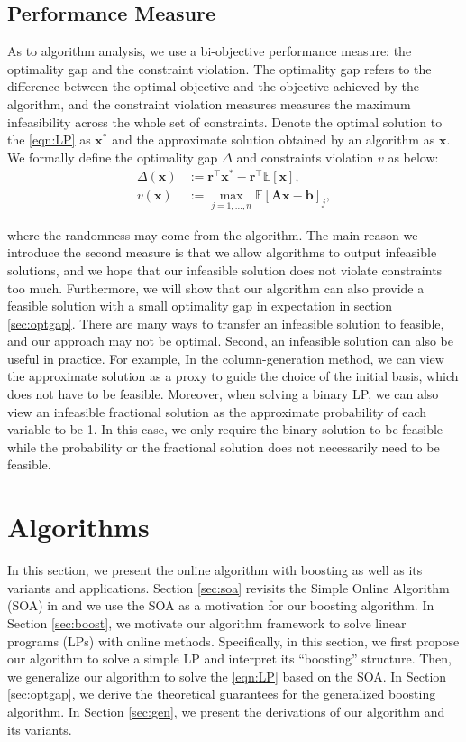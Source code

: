 \documentclass{article} %
\begin{document}
\subsection{Performance Measure}
\label{sec:perfmeas}
As to algorithm analysis, we use a bi-objective performance measure: the optimality gap and the constraint violation. The optimality gap refers to the difference between the optimal objective and the objective achieved by the algorithm, and the constraint violation measures measures the maximum infeasibility across the whole set of constraints. Denote the optimal solution to the \ref{eqn:LP} as $\bm{x}^*$ and the approximate solution obtained by an algorithm as $\bm{x}$. We formally define the optimality gap $\Delta$ and constraints violation $v$ as below:
\begin{align}
    \Delta(\bm{x})&:= \bm{r}^{\top}\bm{x}^*-\bm{r}^\top\mathbb{E}[\bm{x}], \nonumber \\
    v(\bm{x})&:= \max\limits_{j=1,...,n} \mathbb{E} [\bm{A}\bm{x}-\bm{b}]_j\nonumber,
\end{align}

where the randomness may come from the algorithm. The main reason we introduce the second measure is that we allow algorithms to output infeasible solutions, and we hope that our infeasible solution does not violate constraints too much. Furthermore, we will show that our algorithm can also provide a feasible solution with a small optimality gap in expectation in section \ref{sec:optgap}. There are many ways to transfer an infeasible solution to feasible, and our approach may not be optimal. Second, an infeasible solution can also be useful in practice. For example, In the column-generation method, we can view the approximate solution as a proxy to guide the choice of the initial basis, which does not have to be feasible. Moreover, when solving a binary LP, we can also view an infeasible fractional solution as the approximate probability of each variable to be 1. In this case, we only require the binary solution to be feasible while the probability or the fractional solution does not necessarily need to be feasible.


\section{Algorithms}
\label{sec:Alg}
In this section, we present the online algorithm with boosting as well as its variants and applications. Section \ref{sec:soa} revisits the Simple Online Algorithm (SOA) in \cite{li2020simple} and we use the SOA as a motivation for our boosting algorithm. In Section \ref{sec:boost}, we motivate our algorithm framework to solve linear programs (LPs) with online methods. Specifically, in this section, we first propose our algorithm to solve a simple LP and interpret its ``boosting'' structure. Then, we generalize our algorithm to solve the \eqref{eqn:LP} based on the SOA. In Section \ref{sec:optgap}, we derive the theoretical guarantees for the generalized boosting algorithm. In Section \ref{sec:gen}, we present the derivations of our algorithm and its variants. 
\end{document}

